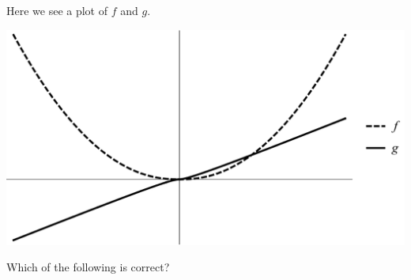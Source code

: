 \documentclass{ximera}
\author{Bart Snapp}
\begin{document}
\begin{exercise}
Here we see a plot of $f$ and $g$. 
\begin{image}
\includegraphics[width=.5\textwidth]{graphFandG6.png}
\end{image}
Which of the following is correct?
\begin{multipleChoice}
\end{multipleChoice}
\end{exercise}
\end{document}
